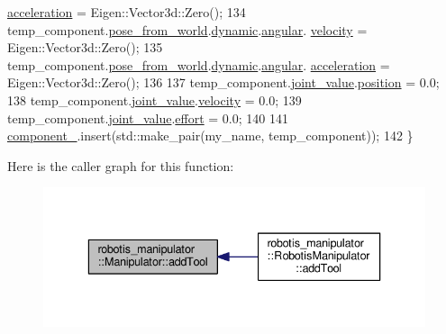 \begin{DoxyCode}
      \hyperlink{structrobotis__manipulator_1_1_dynamicvector_afc83eba2d67af4c23150a08824f0f01e}{acceleration} = Eigen::Vector3d::Zero();
134   temp\_component.\hyperlink{structrobotis__manipulator_1_1_component_a0b28dd5fe885ff8f07d75733d6e777fc}{pose\_from\_world}.\hyperlink{structrobotis__manipulator_1_1_pose_a8accf10d21933e07ade2728fcccf4ae6}{dynamic}.\hyperlink{structrobotis__manipulator_1_1_dynamic_pose_a424459b0d1108f1e65594f5d193cbae6}{angular}.
      \hyperlink{structrobotis__manipulator_1_1_dynamicvector_a6bbccf8316887a8da3cd6aa065f3beac}{velocity} = Eigen::Vector3d::Zero();
135   temp\_component.\hyperlink{structrobotis__manipulator_1_1_component_a0b28dd5fe885ff8f07d75733d6e777fc}{pose\_from\_world}.\hyperlink{structrobotis__manipulator_1_1_pose_a8accf10d21933e07ade2728fcccf4ae6}{dynamic}.\hyperlink{structrobotis__manipulator_1_1_dynamic_pose_a424459b0d1108f1e65594f5d193cbae6}{angular}.
      \hyperlink{structrobotis__manipulator_1_1_dynamicvector_afc83eba2d67af4c23150a08824f0f01e}{acceleration} = Eigen::Vector3d::Zero();
136 
137   temp\_component.\hyperlink{structrobotis__manipulator_1_1_component_a06de8406b177d397a1f998fdf9d67d95}{joint\_value}.\hyperlink{structrobotis__manipulator_1_1_point_a0f122386b502d9b316bdead542ed2145}{position} = 0.0;
138   temp\_component.\hyperlink{structrobotis__manipulator_1_1_component_a06de8406b177d397a1f998fdf9d67d95}{joint\_value}.\hyperlink{structrobotis__manipulator_1_1_point_a4eaec95fac0c755eb0aa704b36ebe97b}{velocity} = 0.0;
139   temp\_component.\hyperlink{structrobotis__manipulator_1_1_component_a06de8406b177d397a1f998fdf9d67d95}{joint\_value}.\hyperlink{structrobotis__manipulator_1_1_point_add1a7019fc87cc2ac9bdf033372a9bb6}{effort} = 0.0;
140 
141   \hyperlink{classrobotis__manipulator_1_1_manipulator_a20b388b821f161972c2cf737fe1c26db}{component\_}.insert(std::make\_pair(my\_name, temp\_component));
142 \}
\end{DoxyCode}


Here is the caller graph for this function\+:\nopagebreak
\begin{figure}[H]
\begin{center}
\leavevmode
\includegraphics[width=336pt]{classrobotis__manipulator_1_1_manipulator_a55b0500cb070eef28b7c133dacd98d38_icgraph}
\end{center}
\end{figure}


